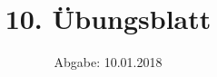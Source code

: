 
\usepackage{longtable}
\usepackage{wrapfig}
\usepackage{ dsfont }
\usepackage{tcolorbox}
\subject{SMD-Abgabe}
\title{10. Übungsblatt}
\date{%
  Abgabe: 10.01.2018
}


  \setlength{\parindent}{0em}
  \maketitle
  \thispagestyle{empty}
  \newpage

  \newenvironment{console1}[1]
  {\begin{center}
  \begin{minipage}[t]{0.99\linewidth}
  \begin{tcolorbox}[colback=gray!5,colframe=black!40!black,title= Ausgabe des Programms: #1 ]
    }
    {
  \end{tcolorbox}
  \end{minipage}
  \end{center}
  }


%



